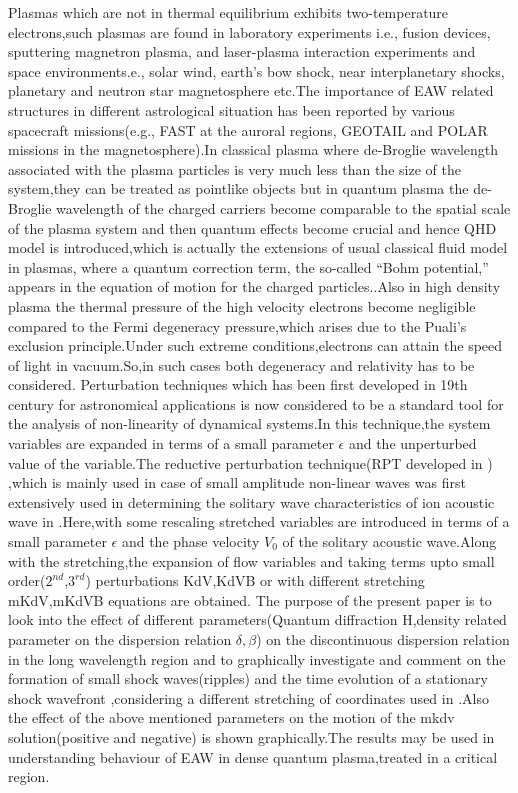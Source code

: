 \documentclass[a4paper, 12pt]{article}
\begin{document}
Plasmas which are not in thermal equilibrium exhibits two-temperature electrons,such plasmas are found in laboratory experiments\cite{armst,diti,kadom} i.e., fusion devices, sputtering magnetron plasma, and laser-plasma interaction experiments and space environments\cite{and,bame}.e., solar wind, earth’s bow shock, near interplanetary shocks, planetary and neutron star magnetosphere etc.\cite{manta}The importance of EAW related structures in different astrological situation has been reported by various spacecraft missions\cite{roth}(e.g., FAST at the auroral regions, GEOTAIL and POLAR missions in the magnetosphere).In classical plasma where de-Broglie wavelength associated with the plasma particles is very much less than the size of the system,they can be treated as pointlike objects but in quantum plasma the de-Broglie wavelength of the charged carriers become comparable to the spatial scale of the plasma system and then quantum effects become crucial and hence QHD model is introduced,which is actually the extensions of usual classical fluid model in plasmas, where a quantum correction term, the so-called “Bohm potential,” appears in the equation of motion for the charged particles.\cite{haas,manta}.Also in high density plasma the thermal pressure of the high velocity electrons become negligible compared to the Fermi degeneracy pressure,which arises due to the Puali’s exclusion principle.Under such extreme conditions,electrons can attain the speed of light in vacuum.So,in such cases both degeneracy and relativity has to be considered.\cite{sc}
\newline
Perturbation techniques which has been first developed in 19th century for astronomical applications is now considered to be a standard tool for the analysis of non-linearity of dynamical systems.In this technique,the system variables are expanded in terms of a small parameter $\epsilon$ and the unperturbed value of the variable.The reductive perturbation technique(RPT developed in \cite{gard}) ,which is mainly used in case of small amplitude non-linear waves was  first extensively used in determining the solitary wave characteristics of ion acoustic wave in \cite{watanabe} .Here,with some rescaling stretched variables are introduced in terms of a small parameter $\epsilon$ and the phase velocity $V_0$ of the solitary acoustic wave.Along with the stretching,the expansion of flow variables and taking terms upto small order($2^{nd}$,$3^{rd}$) perturbations KdV,KdVB or with different stretching mKdV,mKdVB equations are obtained.
\newline
The purpose of the present paper is to look into the effect of different parameters(Quantum diffraction H,density related parameter on the dispersion relation $\delta,\beta$) on the discontinuous dispersion relation in the long wavelength region and to graphically investigate and comment on the formation of small shock waves(ripples) and the time evolution of a stationary shock wavefront ,considering a different stretching of coordinates used in \cite{sc}.Also the effect of the above mentioned parameters on the motion of the mkdv solution(positive and negative) is shown graphically.The results may be used in understanding behaviour of EAW in dense quantum plasma,treated in a critical region.
\end{document}
